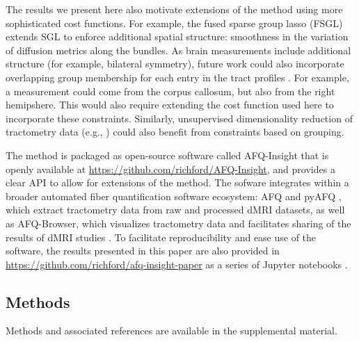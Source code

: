 \documentclass[10pt,%
               aps,%
               prl,%
               reprint,%
               superscriptaddress,%
               preprintnumbers,%
               linenumbers,%
               amsmath,%
               floatfix]{revtex4-1}
\begin{document}

The results we present here also motivate extensions of the method using more
sophisticated cost functions. For example, the fused sparse group lasso (FSGL)
\cite{zhou2012} extends SGL to enforce additional spatial structure: smoothness
in the variation of diffusion metrics along the bundles. As brain measurements
include additional structure (for example, bilateral symmetry), future work
could also incorporate overlapping group membership for each entry in the tract
profiles \cite{Rao2014-xm}. For example, a measurement could come from the
corpus callosum, but also from the right hemipshere. This would also require
extending the cost function used here to incorporate these constraints.
Similarly, unsupervised dimensionality reduction of tractometry data (e.g.,
\cite{Chamberland2019-mu}) could also benefit from constraints based on
grouping.

The method is packaged as open-source software called AFQ-Insight that is
openly available at \url{https://github.com/richford/AFQ-Insight}, and
provides a clear API to allow for extensions of the method. The sofware
integrates within a broader automated fiber quantification software
ecosystem: AFQ \cite{yeatman2012tract} and pyAFQ \cite{pyAFQ}, which extract
tractometry data from raw and processed dMRI datasets, as well as
AFQ-Browser, which visualizes tractometry data and facilitates sharing of the
results of dMRI studies \cite{yeatman2018browser}. To facilitate
reproducibility and ease use of the software, the results presented in this
paper are also provided in
\url{https://github.com/richford/afq-insight-paper} as a series of Jupyter
notebooks \cite{kluyver2016jupyter}.

\subsection*{Methods}

Methods and associated references are available in the supplemental material.
\end{document}
